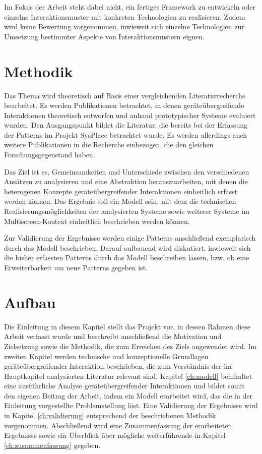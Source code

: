 Im Fokus der Arbeit steht dabei nicht, ein fertiges Framework zu entwickeln oder einzelne Interaktionsmuster mit konkreten Technologien zu realisieren. Zudem wird keine Bewertung vorgenommen, inwieweit sich einzelne Technologien zur Umsetzung bestimmter Aspekte von Interaktionsmustern eignen.

\section{Methodik}
Das Thema wird theoretisch auf Basis einer vergleichenden Literaturrecherche bearbeitet. Es werden Publikationen betrachtet, in denen geräteübergreifende Interaktionen theoretisch entworfen und anhand prototypischer Systeme evaluiert wurden. Den Ausgangspunkt bildet die Literatur, die bereits bei der Erfassung der Patterns im Projekt SysPlace betrachtet wurde. Es werden allerdings auch weitere Publikationen in die Recherche einbezogen, die den gleichen Forschungsgegenstand haben.

Das Ziel ist es, Gemeinsamkeiten und Unterschiede zwischen den verschiedenen Ansätzen zu analysieren und eine Abstraktion herauszuarbeiten, mit denen die heterogenen Konzepte geräteübergreifender Interaktionen einheitlich erfasst werden können. Das Ergebnis soll ein Modell sein, mit dem die technischen Realisierungsmöglichkeiten der analysierten Systeme sowie weiterer Systeme im Multiscreen-Kontext einheitlich beschrieben werden können. 

Zur Validierung der Ergebnisse werden einige Patterns anschließend exemplarisch durch das Modell beschrieben. Darauf aufbauend wird diskutiert, inwieweit sich die bisher erfassten Patterns durch das Modell beschreiben lassen, bzw. ob eine Erweiterbarkeit um neue Patterns gegeben ist.

\section{Aufbau}
Die Einleitung in diesem Kapitel stellt das Projekt vor, in dessen Rahmen diese Arbeit verfasst wurde und beschreibt anschließend die Motivation und Zielsetzung sowie die Methodik, die zum Erreichen des Ziels angewendet wird. Im zweiten Kapitel werden technische und konzeptionelle Grundlagen geräteübergreifender Interaktion beschrieben, die zum Verständnis der im Hauptkapitel analysierten Literatur relevant sind. Kapitel \ref{ch:modell} beinhaltet eine ausführliche Analyse geräteübergreifender Interaktionen und bildet somit den eigenen Beitrag der Arbeit, indem ein Modell erarbeitet wird, das die in der Einleitung vorgestellte Problemstellung löst. Eine Validierung der Ergebnisse wird in Kapitel \ref{ch:validierung} entsprechend der beschriebenen Methodik vorgenommen. Abschließend wird eine Zusammenfassung der erarbeiteten Ergebnisse sowie ein Überblick über mögliche weiterführende in Kapitel \ref{ch:zusammenfassung} gegeben.

